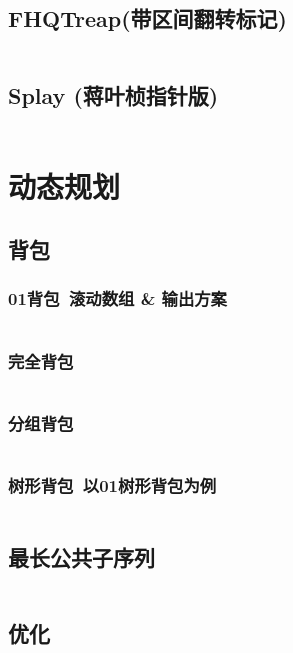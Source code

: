 \documentclass[utf8]{ctexart}
\newcommand{\cpp}[1]{\inputminted[linenos,breaklines,tabsize=4,mathescape]{c++}{#1}}
\begin{document}
\subsection[FHQTreap]{FHQTreap(带区间翻转标记)}
\cpp{codes/data-struct/fhq-treap.cpp}

\subsection[Splay]{Splay (蒋叶桢指针版)}
\cpp{codes/data-struct/splay.cpp}

\section{动态规划}

\subsection{背包}

\subsubsection[01背包]{01背包\ 滚动数组 \& 输出方案}
\cpp{codes/dp/01-pack.cpp}

\subsubsection{完全背包}
\cpp{codes/dp/complete-pack.cpp}

\subsubsection{分组背包}
\cpp{codes/dp/group-pack.cpp}

\subsubsection[树形背包]{树形背包\ 以01树形背包为例}
\cpp{codes/dp/tree-pack.cpp}


\subsection{最长公共子序列}
\cpp{codes/dp/lcm.cpp}

\subsection{优化}
\end{document}
